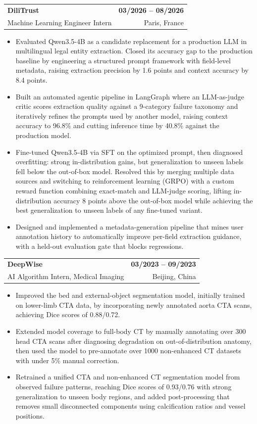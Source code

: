 \documentclass[a4paper,12pt]{article}
\makeatletter
\newcommand{\resumeItem}[1]{
  \item\small{
    {#1\vspace{-1pt}}
  }
}
\newcommand{\resumeSubheading}[4]{
  \vspace{-2pt plus 12pt}\item
    \begin{tabular*}{1.0\textwidth}[t]{l@{\extracolsep{\fill}}r}
      \textbf{#1} & \textbf{#2} \\
      {#3} & \textnormal{#4} \\
    \end{tabular*}\vspace{-7pt}\nopagebreak[4]
}
\newcommand{\resumeItemListStart}{\begin{itemize}}
\newcommand{\resumeItemListEnd}{\end{itemize}\vspace{-5pt}}
\makeatother
\begin{document}
    \resumeSubheading
      {DiliTrust}{03/2026 -- 08/2026}
      {Machine Learning Engineer Intern}{Paris, France}
      \resumeItemListStart
        \resumeItem{Evaluated Qwen3.5-4B as a candidate replacement for a production LLM in multilingual legal entity extraction. Closed its accuracy gap to the production baseline by engineering a structured prompt framework with field-level metadata, raising extraction precision by 1.6 points and context accuracy by 8.4 points.}
        \resumeItem{Built an automated agentic pipeline in LangGraph where an LLM-as-judge critic scores extraction quality against a 9-category failure taxonomy and iteratively refines the prompts used by another model, raising context accuracy to 96.8\% and cutting inference time by 40.8\% against the production model.}
        \resumeItem{Fine-tuned Qwen3.5-4B via SFT on the optimized prompt, then diagnosed overfitting: strong in-distribution gains, but generalization to unseen labels fell below the out-of-box model. Resolved this by merging multiple data sources and switching to reinforcement learning (GRPO) with a custom reward function combining exact-match and LLM-judge scoring, lifting in-distribution accuracy 8 points above the out-of-box model while achieving the best generalization to unseen labels of any fine-tuned variant.}
        \resumeItem{Designed and implemented a metadata-generation pipeline that mines user annotation history to automatically improve per-field extraction guidance, with a held-out evaluation gate that blocks regressions.}
      \resumeItemListEnd

    \resumeSubheading
      {DeepWise}{03/2023 -- 09/2023}
      {AI Algorithm Intern, Medical Imaging}{Beijing, China}
      \resumeItemListStart
        \resumeItem{Improved the bed and external-object segmentation model, initially trained on lower-limb CTA data, by incorporating newly annotated aorta CTA scans, achieving Dice scores of 0.88/0.72.}
        \resumeItem{Extended model coverage to full-body CT by manually annotating over 300 head CTA scans after diagnosing degradation on out-of-distribution anatomy, then used the model to pre-annotate over 1000 non-enhanced CT datasets with under 5\% manual correction.}
        \resumeItem{Retrained a unified CTA and non-enhanced CT segmentation model from observed failure patterns, reaching Dice scores of 0.93/0.76 with strong generalization to unseen body regions, and added post-processing that removes small disconnected components using calcification ratios and vessel positions.}
      \resumeItemListEnd
\end{document}
